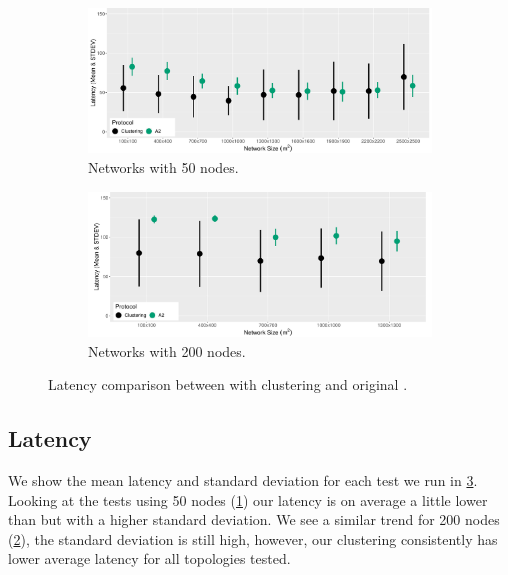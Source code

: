 \begin{figure}[bt]
    \centering
    \begin{subfigure}{0.7\textwidth}
        \centering
        \includegraphics[width=\textwidth]{figure/Results/ChaosComparison/ChaosComparison_50_Latency.pdf}
        \caption{Networks with 50 nodes.}
        \label{subfig:latency-50-nodes}
    \end{subfigure}
    \hfill
    \begin{subfigure}{0.7\textwidth}
        \centering
        \includegraphics[width=\textwidth]{figure/Results/ChaosComparison/ChaosComparison_200_Latency.pdf}
        \caption{Networks with 200 nodes.}
        \label{subfig:latency-200-nodes}
    \end{subfigure}
    \caption{Latency comparison between \atwo{} with clustering and original \atwo{}.}
    \label{fig:latency-results}
\end{figure}

\subsection{Latency}
We show the mean latency and standard deviation for each test we run in \cref{fig:latency-results}. Looking at the tests using 50 nodes (\cref{subfig:latency-50-nodes}) our latency is on average a little lower than \atwo{} but with a higher standard deviation. We see a similar trend for 200 nodes (\cref{subfig:latency-200-nodes}), the standard deviation is still high, however, our clustering consistently has lower average latency for all topologies tested. 

